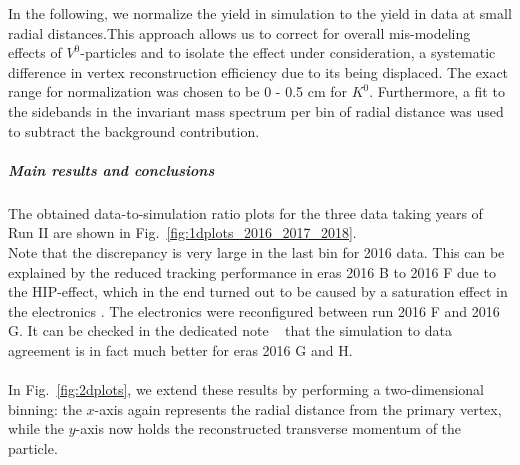 In the following, we normalize the yield in simulation to the yield in
data at small radial distances.This approach allows us to correct for
overall mis-modeling effects of $V^0$-particles
and to isolate the effect under consideration, \ie a systematic
difference in vertex reconstruction efficiency due to its being
displaced. The exact range for normalization was chosen to be 0 - 0.5
cm for $K^0$. Furthermore, a fit to the sidebands in the invariant mass spectrum per bin of radial distance was used to subtract the background contribution.
\vspace{3cm}
\subparagraph{Main results and conclusions}\label{sec:mainresults}
The obtained data-to-simulation ratio plots for the three data taking
years of Run II are shown in Fig.~\ref{fig:1dplots_2016_2017_2018}. \\
Note that the discrepancy is very large in the last bin for 2016 data. This can be explained by the reduced tracking performance in eras 2016 B to 2016 F due to the HIP-effect, which in the end turned out to be caused by a saturation effect in the electronics \cite{hipeffect}. The electronics were reconfigured between run 2016 F and 2016 G. It can be checked in the dedicated note ~\cite{AN-20-111_KshortStudy} that the simulation to data agreement is in fact much better for eras 2016 G and H. \\ \\
In Fig.~\ref{fig:2dplots}, we extend these results by performing a two-dimensional binning: the $x$-axis again represents the radial distance from the primary vertex, while the $y$-axis now holds the reconstructed transverse momentum of the particle. 

